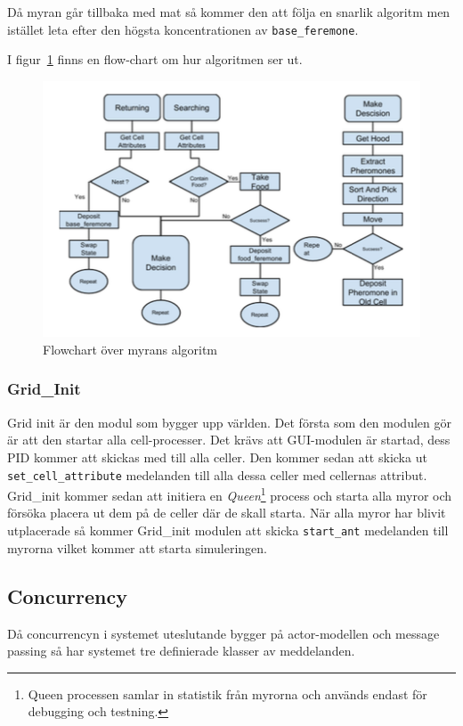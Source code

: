 \documentclass[12pt]{article}
\begin{document}
Då myran går tillbaka med mat så kommer den att följa en snarlik algoritm men istället leta efter den högsta koncentrationen av \texttt{base\_feremone}.

I figur~\ref{fig:ant-algorithm} finns en flow-chart om hur algoritmen ser ut.


\begin{figure}
    \centering
    \includegraphics[width=\textwidth]{BugsLife-Fig3.png}
    \caption{Flowchart över myrans algoritm}\label{fig:ant-algorithm}
\end{figure}

\subsubsection{Grid\_Init}
Grid init är den modul som bygger upp världen.
Det första som den modulen gör är att den startar alla cell-processer.
Det krävs att GUI-modulen är startad,
dess PID kommer att skickas med till alla celler.
Den kommer sedan att skicka ut \texttt{set\_cell\_attribute} medelanden till alla dessa celler med cellernas attribut.
Grid\_init kommer sedan att initiera en \textit{Queen}\footnote{Queen processen samlar in statistik från myrorna och används endast för debugging och testning.} process och starta alla myror och försöka placera ut dem på de celler där de skall starta.
När alla myror har blivit utplacerade så kommer Grid\_init modulen att skicka \texttt{start\_ant} medelanden till myrorna vilket kommer att starta simuleringen.

\subsection{Concurrency}
Då concurrencyn i systemet uteslutande bygger på actor-modellen och message passing så har systemet tre definierade klasser av meddelanden.
\end{document}
